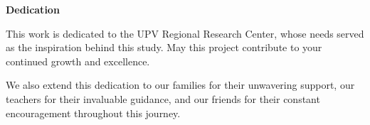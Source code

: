 \begin{center}
	\textbf{Dedication}
\end{center}


This work is dedicated to the UPV Regional Research Center, whose needs served as the inspiration behind this study. May this project contribute to your continued growth and excellence.

We also extend this dedication to our families for their unwavering support, our teachers for their invaluable guidance, and our friends for their constant encouragement throughout this journey.